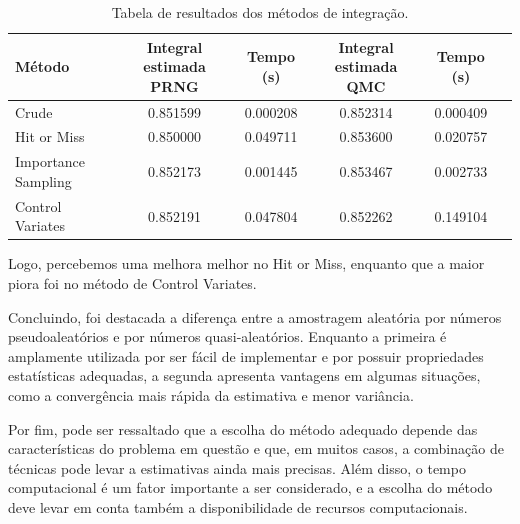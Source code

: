 \documentclass[a4paper]{article}
\begin{document}
\begin{table}[h]
\centering
\begin{tabular}{|l|c|c|c|c|c|}
\hline
Método & Integral estimada PRNG & Tempo (s) & Integral estimada QMC & Tempo (s) \\
\hline
Crude & 0.851599 & 0.000208 & 0.852314 & 0.000409  \\
\hline
Hit or Miss & 0.850000 & 0.049711 & 0.853600 & 0.020757 \\
\hline
Importance Sampling & 0.852173 & 0.001445 & 0.853467 & 0.002733 \\
\hline
Control Variates & 0.852191 & 0.047804 & 0.852262 & 0.149104\\
\hline
\end{tabular}
\caption{Tabela de resultados dos métodos de integração.}
\label{tab:resultados}
\end{table}

Logo, percebemos uma melhora melhor no Hit or Miss, enquanto que a maior piora foi no método de Control Variates.

Concluindo, foi destacada a diferença entre a amostragem aleatória por números pseudoaleatórios e por números quasi-aleatórios. Enquanto a primeira é amplamente utilizada por ser fácil de implementar e por possuir propriedades estatísticas adequadas, a segunda apresenta vantagens em algumas situações, como a convergência mais rápida da estimativa e menor variância.

Por fim, pode ser ressaltado que a escolha do método adequado depende das características do problema em questão e que, em muitos casos, a combinação de técnicas pode levar a estimativas ainda mais precisas. Além disso, o tempo computacional é um fator importante a ser considerado, e a escolha do método deve levar em conta também a disponibilidade de recursos computacionais.
\end{document}
